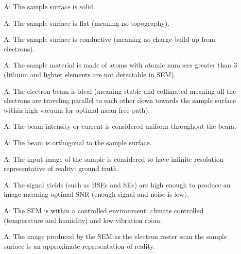 \documentclass[12pt]{article}
\newcounter{assumpnum} %
\begin{document}
\begin{itemize}

\item[A\refstepcounter{assumpnum}\theassumpnum \label{A_sampleSolid}:] The sample 
surface is solid.

\item[A\refstepcounter{assumpnum}\theassumpnum \label{A_sampleTopo}:] The sample 
surface is flat (meaning no topography).

\item[A\refstepcounter{assumpnum}\theassumpnum \label{A_sampleConductive}:] The sample 
surface is conductive (meaning no charge build up from electrons).

\item[A\refstepcounter{assumpnum}\theassumpnum \label{A_sampleZ}:] The sample 
material is made of atoms with atomic numbers greater than 3 (lithium and lighter elements are not detectable in SEM).

\item[A\refstepcounter{assumpnum}\theassumpnum \label{A_beam}:] The electron 
beam is ideal (meaning stable and collimated meaning all the electrons are 
traveling parallel to each other down towards the sample surface within high 
vacuum for optimal mean free path).

\item[A\refstepcounter{assumpnum}\theassumpnum \label{A_beam1}:] The beam 
intensity or current is considered uniform throughout the beam.

\item[A\refstepcounter{assumpnum}\theassumpnum \label{A_beam2}:] The beam is orthogonal to the sample surface.

\item[A\refstepcounter{assumpnum}\theassumpnum \label{A_inputImage}:] The input 
image of the sample is considered to have infinite resolution representative of reality: ground truth.

\item[A\refstepcounter{assumpnum}\theassumpnum \label{A_yield}:] The signal yields (such as BSEs and SEs) are high enough to produce an image meaning optimal SNR (enough signal and noise is low).

\item[A\refstepcounter{assumpnum}\theassumpnum \label{A_environment}:] The SEM 
is within a controlled environment: climate controlled (temperature and 
humidity) and low vibration room.

\item[A\refstepcounter{assumpnum}\theassumpnum \label{A_reality}:] The image 
produced by the SEM as the electron raster scan the sample surface is an 
approximate representation of reality.

\end{itemize}
\end{document}
